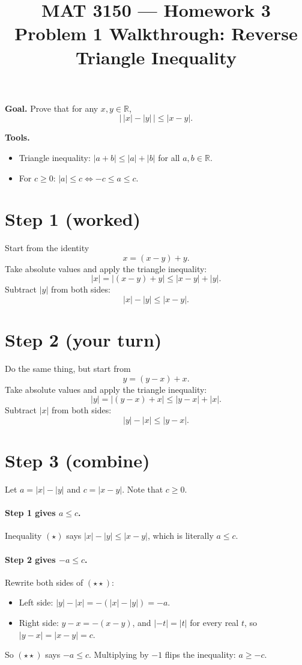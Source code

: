 \documentclass[11pt]{article}
\title{MAT 3150 --- Homework 3\\
\large Problem 1 Walkthrough: Reverse Triangle Inequality}
\author{}
\date{}
\begin{document}
\maketitle

\textbf{Goal.} Prove that for any $x,y\in\mathbb{R}$,
\[
  \bigl|\,|x|-|y|\,\bigr| \le |x-y| .
\]

\textbf{Tools.}
\begin{itemize}
  \item Triangle inequality: $|a+b|\le|a|+|b|$ for all $a,b\in\mathbb{R}$.
  \item For $c\ge 0$: \quad $|a|\le c \iff -c\le a\le c$.
\end{itemize}

\section*{Step 1 (worked)}
Start from the identity
\[
  x = (x-y) + y .
\]
Take absolute values and apply the triangle inequality:
\[
  |x| = |(x-y)+y| \le |x-y| + |y| .
\]
Subtract $|y|$ from both sides:
\[
  |x|-|y| \le |x-y| . \tag{$\star$}
\]

\section*{Step 2 (your turn)}
Do the same thing, but start from
\[
  y = (y-x) + x .
\]
Take absolute values and apply the triangle inequality:
\[
  |y| = |(y-x)+x| \le |y-x| + |x| .
\]
Subtract $|x|$ from both sides:
\[
  |y|-|x| \le |y-x| . \tag{$\star\star$}
\]

\section*{Step 3 (combine)}
Let $a = |x|-|y|$ and $c = |x-y|$. Note that $c \ge 0$.
\paragraph{Step 1 gives $a \le c$.} Inequality $(\star)$ says
$|x|-|y| \le |x-y|$, which is literally $a \le c$.

\paragraph{Step 2 gives $-a \le c$.} Rewrite both sides of $(\star\star)$:
\begin{itemize}
  \item Left side: $|y|-|x| = -(|x|-|y|) = -a$.
  \item Right side: $y-x = -(x-y)$, and $|-t| = |t|$ for every real $t$,
        so $|y-x| = |x-y| = c$.
\end{itemize}
So $(\star\star)$ says $-a \le c$. Multiplying by $-1$ flips the
inequality: $a \ge -c$.
\end{document}
